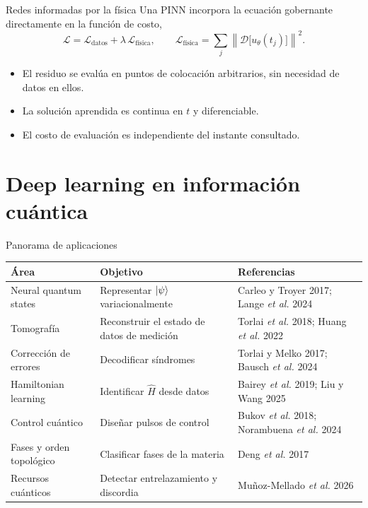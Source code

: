 \documentclass[10pt,aspectratio=169]{beamer}
\newcommand{\Hop}{\hat{H}}
\begin{document}
\begin{frame}{Redes informadas por la física}
  Una PINN incorpora la ecuación gobernante directamente en la función de costo,
  \[
    \mathcal{L} = \mathcal{L}_{\text{datos}} + \lambda\, \mathcal{L}_{\text{física}},
    \qquad
    \mathcal{L}_{\text{física}} = \sum_j \left\| \mathcal{D}\big[u_\theta(t_j)\big] \right\|^2 .
  \]
  \pause
  \vfill
  \begin{itemize}
    \item El residuo se evalúa en puntos de colocación arbitrarios, sin necesidad de datos en ellos.
    \item La solución aprendida es continua en $t$ y diferenciable.
    \item El costo de evaluación es independiente del instante consultado.
  \end{itemize}
\end{frame}

\section{Deep learning en información cuántica}

\begin{frame}{Panorama de aplicaciones}
  \small
  \begin{center}
  \begin{tabular}{p{3.1cm}p{4.0cm}p{4.4cm}}
    \toprule
    \textbf{Área} & \textbf{Objetivo} & \textbf{Referencias} \\
    \midrule
    Neural quantum states & Representar $\ket{\psi}$ variacionalmente & Carleo y Troyer 2017; Lange \emph{et al.} 2024 \\
    Tomografía & Reconstruir el estado de datos de medición & Torlai \emph{et al.} 2018; Huang \emph{et al.} 2022 \\
    Corrección de errores & Decodificar síndromes & Torlai y Melko 2017; Bausch \emph{et al.} 2024 \\
    Hamiltonian learning & Identificar $\Hop$ desde datos & Bairey \emph{et al.} 2019; Liu y Wang 2025 \\
    Control cuántico & Diseñar pulsos de control & Bukov \emph{et al.} 2018; Norambuena \emph{et al.} 2024 \\
    Fases y orden topológico & Clasificar fases de la materia & Deng \emph{et al.} 2017 \\
    Recursos cuánticos & Detectar entrelazamiento y discordia & Muñoz-Mellado \emph{et al.} 2026 \\
    \bottomrule
  \end{tabular}
  \end{center}
\end{frame}
\end{document}
